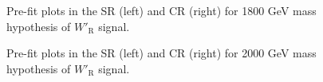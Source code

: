 \begin{figure}[H]
  \centering
  \caption{Pre-fit plots in the SR (left) and CR (right) for 1800 GeV mass hypothesis of $W'_{\text{R}}$ signal.}
  \label{fig:Prefit_WpRH1800_Asimov}
\end{figure}
\begin{figure}[H]
  \centering
  \caption{Pre-fit plots in the SR (left) and CR (right) for 2000 GeV mass hypothesis of $W'_{\text{R}}$ signal.}
  \label{fig:Prefit_WpRH2000_Asimov}
\end{figure}
